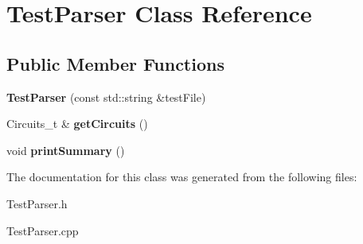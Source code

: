 \hypertarget{classTestParser}{}\section{Test\+Parser Class Reference}
\label{classTestParser}
\subsection*{Public Member Functions}
\begin{DoxyCompactItemize}
\item 
{\bfseries Test\+Parser} (const std\+::string \&test\+File)\hypertarget{classTestParser_a29dda6e0002bf3a467599688a9ef12c1}{}\label{classTestParser_a29dda6e0002bf3a467599688a9ef12c1}

\item 
Circuits\+\_\+t \& {\bfseries get\+Circuits} ()\hypertarget{classTestParser_ab182de4b979edf9e37845514361a684f}{}\label{classTestParser_ab182de4b979edf9e37845514361a684f}

\item 
void {\bfseries print\+Summary} ()\hypertarget{classTestParser_ac781d3262fa87c7c36f667d01e014c34}{}\label{classTestParser_ac781d3262fa87c7c36f667d01e014c34}

\end{DoxyCompactItemize}


The documentation for this class was generated from the following files\+:\begin{DoxyCompactItemize}
\item 
Test\+Parser.\+h\item 
Test\+Parser.\+cpp\end{DoxyCompactItemize}
